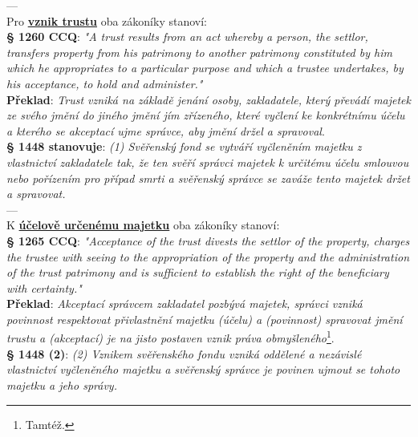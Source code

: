 \documentclass{article}
\begin{document}

---\\

Pro \textbf{\underline{vznik trustu}} oba zákoníky stanoví:\\

\textbf{§ 1260 CCQ}: \textit{"A trust results from an act whereby a person, the settlor, transfers property from his patrimony to another patrimony constituted by him which he appropriates to a particular purpose and which a trustee undertakes, by his acceptance, to hold and administer."}\\

\textbf{Překlad}: \textit{Trust vzniká na základě jenání osoby, zakladatele, který převádí majetek ze svého jmění do jiného jmění jím zřízeného, které vyčlení ke konkrétnímu účelu a kterého se akceptací ujme správce, aby jmění držel a spravoval}.\\

\textbf{§ 1448 stanovuje}:
\textit{(1) Svěřenský fond se vytváří vyčleněním majetku z vlastnictví zakladatele tak, že ten svěří správci majetek k určitému účelu smlouvou nebo pořízením pro případ smrti a svěřenský správce se zaváže tento majetek držet a spravovat.}\\

---\\

K \textbf{\underline{účelově určenému majetku}} oba zákoníky stanoví:\\

\textbf{§ 1265 CCQ}: \textit{"Acceptance of the trust divests the settlor of the property, charges the trustee with seeing to the appropriation of the property and the administration of the trust patrimony and is sufficient to establish the right of the beneficiary with certainty."}\\

\textbf{Překlad}: \textit{Akceptací správcem zakladatel pozbývá majetek, správci vzniká povinnost respektovat přivlastnění majetku (účelu) a (povinnost) spravovat jmění trustu a (akceptací) je na jisto postaven vznik práva obmyšleného}\footnote{Tamtéž.}.\\

\textbf{§ 1448 (2)}:
\textit{(2) Vznikem svěřenského fondu vzniká oddělené a nezávislé vlastnictví vyčleněného majetku a svěřenský správce je povinen ujmout se tohoto majetku a jeho správy.}\\
\end{document}
